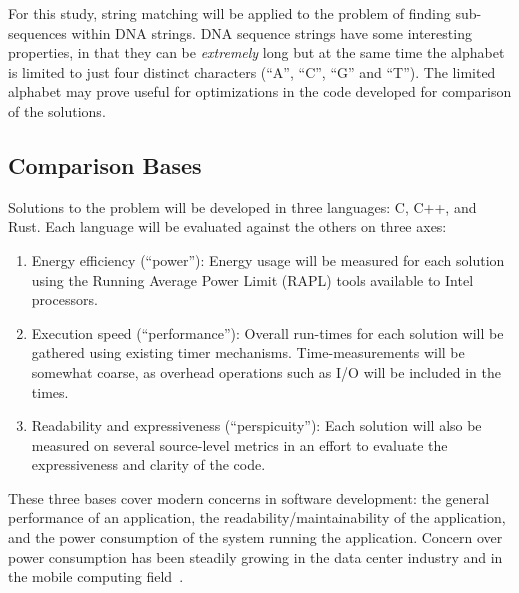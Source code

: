 For this study, string matching will be applied to the problem of finding sub-sequences within DNA strings. DNA sequence strings have some interesting properties, in that they can be \textit{extremely} long but at the same time the alphabet is limited to just four distinct characters (``A'', ``C'', ``G'' and ``T''). The limited alphabet may prove useful for optimizations in the code developed for comparison of the solutions.

\subsection{Comparison Bases}

Solutions to the problem will be developed in three languages: C, C++, and Rust. Each language will be evaluated against the others on three axes:

\begin{enumerate}
\item Energy efficiency (``power''): Energy usage will be measured for each solution using the Running Average Power Limit (RAPL) tools available to Intel processors.
\item Execution speed (``performance''): Overall run-times for each solution will be gathered using existing timer mechanisms. Time-measurements will be somewhat coarse, as overhead operations such as I/O will be included in the times.
\item Readability and expressiveness (``perspicuity''): Each solution will also be measured on several source-level metrics in an effort to evaluate the expressiveness and clarity of the code.
\end{enumerate}

These three bases cover modern concerns in software development: the general performance of an application, the readability/maintainability of the application, and the power consumption of the system running the application. Concern over power consumption has been steadily growing in the data center industry and in the mobile computing field~\cite{pereira.et.al.2017}.

